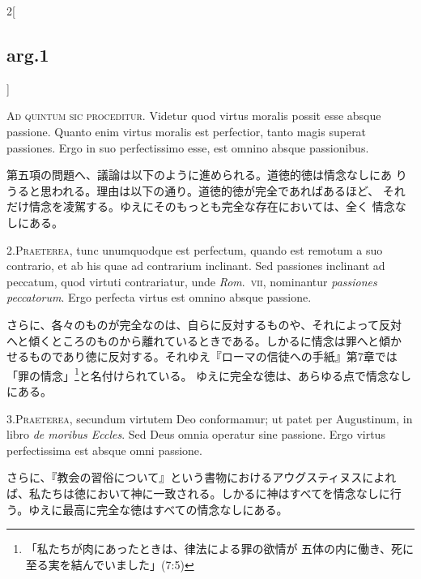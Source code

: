 \documentclass[paper=a4paper,fontsize=10pt,jafontsize=9pt,titlepage]{jlreq}
\begin{document}
\begin{paracol}{2}[\subsection{arg.1}]

{\scshape Ad quintum sic proceditur}. Videtur quod virtus moralis
possit esse absque passione. Quanto enim virtus moralis est
perfectior, tanto magis superat passiones. Ergo in suo perfectissimo
esse, est omnino absque passionibus.

\switchcolumn

第五項の問題へ、議論は以下のように進められる。道徳的徳は情念なしにあ
 りうると思われる。理由は以下の通り。道徳的徳が完全であればあるほど、
 それだけ情念を凌駕する。ゆえにそのもっとも完全な存在においては、全く
 情念なしにある。


2.{\scshape Praeterea}, tunc unumquodque est perfectum, quando est
remotum a suo contrario, et ab his quae ad contrarium inclinant. Sed
passiones inclinant ad peccatum, quod virtuti contrariatur, unde
{\itshape Rom}.~{\scshape vii}, nominantur {\itshape passiones
peccatorum}. Ergo perfecta virtus est omnino absque passione.

\switchcolumn

さらに、各々のものが完全なのは、自らに反対するものや、それによって反対
へと傾くところのものから離れているときである。しかるに情念は罪へと傾か
せるものであり徳に反対する。それゆえ『ローマの信徒への手紙』第7章では
「罪の情念」\footnote{「私たちが肉にあったときは、律法による罪の欲情が
五体の内に働き、死に至る実を結んでいました」(7:5)}と名付けられている。
ゆえに完全な徳は、あらゆる点で情念なしにある。


3.{\scshape Praeterea}, secundum virtutem Deo conformamur; ut patet
per Augustinum, in libro {\itshape de moribus Eccles}. Sed Deus omnia operatur
sine passione. Ergo virtus perfectissima est absque omni passione.

\switchcolumn

さらに、『教会の習俗について』という書物におけるアウグスティヌスによれ
ば、私たちは徳において神に一致される。しかるに神はすべてを情念なしに行
う。ゆえに最高に完全な徳はすべての情念なしにある。


\end{paracol}
\end{document}
